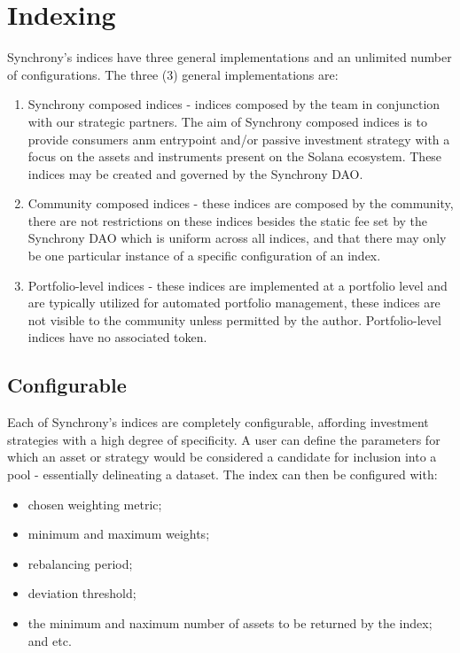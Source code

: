 \documentclass[10pt]{article}
\begin{document}
					\section{Indexing}
					Synchrony's indices have three general implementations and an unlimited number
					of configurations. The three (3) general implementations are:
					\begin{enumerate}
						\item Synchrony composed indices - indices composed by the team in
							conjunction with our strategic partners. The aim of Synchrony composed
							indices is to provide consumers anm entrypoint and/or passive investment
							strategy with a focus on the assets and instruments present on the
							Solana ecosystem. These indices may be created and governed by the
							Synchrony DAO.
						\item Community composed indices - these indices are composed by the
							community, there are not restrictions on these indices besides the
							static fee set by the Synchrony DAO which is uniform across all indices,
							and that there may only be one particular instance of a specific
							configuration of an index.
						\item Portfolio-level indices - these indices are implemented at a portfolio
							level and are typically utilized for automated portfolio management,
							these indices are not visible to the community unless permitted by the
							author. Portfolio-level indices have no associated token.
					\end{enumerate}

					\subsection{Configurable}
					Each of Synchrony's indices are completely configurable, affording investment
					strategies with a high degree of specificity. A user can define the parameters
					for which an asset or strategy would be considered a candidate for inclusion
					into a pool - essentially delineating a dataset. The index can then be
					configured with:
					\begin{itemize}
						\item chosen weighting metric; 
						\item minimum and maximum weights;
						\item rebalancing period; 
						\item deviation threshold; 
						\item the minimum and naximum number of assets to be returned by the index;
							and etc.
					\end{itemize}
\end{document}
